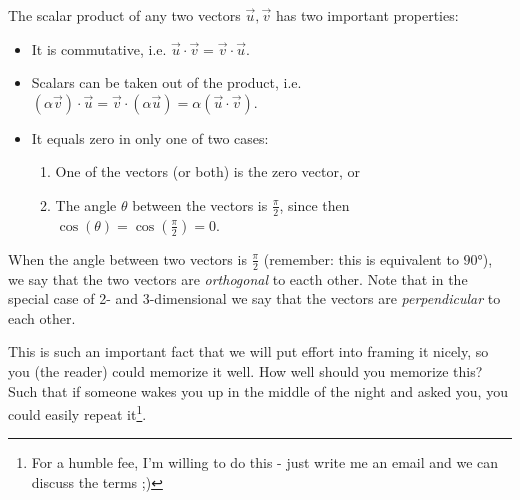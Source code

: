 The scalar product of any two vectors $\vec{u},\vec{v}$ has two important properties:
\begin{itemize}
	\item It is commutative, i.e. $\vec{u}\cdot\vec{v} = \vec{v}\cdot\vec{u}$.
	\item Scalars can be taken out of the product, i.e. $\left(\alpha \vec{v}\right)\cdot\vec{u} = \vec{v}\cdot\left( \alpha\vec{u} \right) = \alpha\left( \vec{u}\cdot\vec{v} \right)$.
	\item It equals zero in only one of two cases:
		\begin{enumerate}
			\item One of the vectors (or both) is the zero vector, or
			\item The angle $\theta$ between the vectors is $\frac{\pi}{2}$, since then $\cos(\theta)=\cos\left(\frac{\pi}{2}\right)=0$.
		\end{enumerate}
\end{itemize}

When the angle between two vectors is $\frac{\pi}{2}$ (remember: this is equivalent to $\ang{90}$), we say that the two vectors are \emph{orthogonal} to eacth other. Note that in the special case of 2- and 3-dimensional we say that the vectors are \emph{perpendicular} to each other.

This is such an important fact that we will put effort into framing it nicely, so you (the reader) could memorize it well. How well should you memorize this? Such that if someone wakes you up in the middle of the night and asked you, you could easily repeat it\footnote{For a humble fee, I'm willing to do this - just write me an email and we can discuss the terms ;)}.

\begin{figure}[H]
	\centering
\end{figure}

